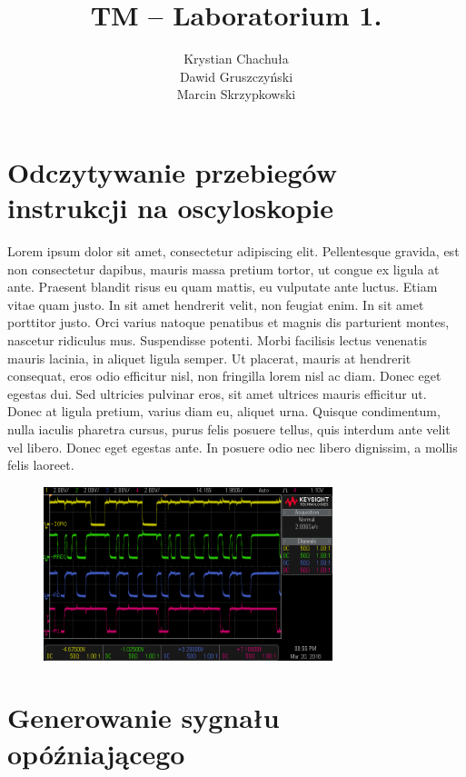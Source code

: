 \documentclass[fleqn]{article}
\title{TM -- Laboratorium 1.}
\author{Krystian Chachuła \\ Dawid Gruszczyński \\ Marcin Skrzypkowski}
\begin{document}
\maketitle

\setcounter{page}{0}
\thispagestyle{empty}

\pagebreak

\setcounter{page}{1}

\section{Odczytywanie przebiegów instrukcji na oscyloskopie}

Lorem ipsum dolor sit amet, consectetur adipiscing elit. Pellentesque gravida, est non consectetur dapibus, mauris massa pretium tortor, ut congue ex ligula at ante. Praesent blandit risus eu quam mattis, eu vulputate ante luctus. Etiam vitae quam justo. In sit amet hendrerit velit, non feugiat enim. In sit amet porttitor justo. Orci varius natoque penatibus et magnis dis parturient montes, nascetur ridiculus mus. Suspendisse potenti. Morbi facilisis lectus venenatis mauris lacinia, in aliquet ligula semper. Ut placerat, mauris at hendrerit consequat, eros odio efficitur nisl, non fringilla lorem nisl ac diam. Donec eget egestas dui. Sed ultricies pulvinar eros, sit amet ultrices mauris efficitur ut. Donec at ligula pretium, varius diam eu, aliquet urna. Quisque condimentum, nulla iaculis pharetra cursus, purus felis posuere tellus, quis interdum ante velit vel libero. Donec eget egestas ante. In posuere odio nec libero dignissim, a mollis felis laoreet.

\begin{figure}[H]
	\centering
	\includegraphics[width=0.75\textwidth]{img/1a.png}
	\caption{}
\end{figure}

\section{Generowanie sygnału opóźniającego}
\end{document}
